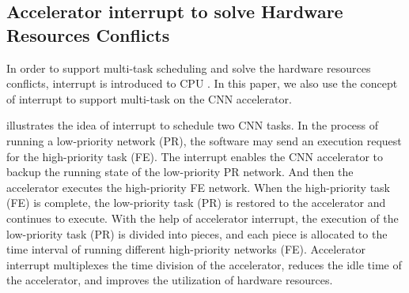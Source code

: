 

\subsection{ Accelerator interrupt to solve Hardware Resources Conflicts }

In order to support multi-task scheduling and solve the hardware resources conflicts, interrupt is introduced to CPU \cite{jen1974processor}. In this paper, we also use the concept of interrupt to support multi-task on the CNN accelerator.


 illustrates the idea of interrupt to schedule two CNN tasks. In the process of running a low-priority network (PR), the software may send an execution request for the high-priority task (FE). The interrupt enables the CNN accelerator to backup the running state of the low-priority PR network. And then the accelerator executes the high-priority FE network. When the high-priority task (FE) is complete, the low-priority task (PR) is restored to the accelerator and continues to execute.
With the help of accelerator interrupt, the execution of the low-priority task (PR) is divided into pieces, and each piece is allocated to the time interval of running different high-priority networks (FE). 
Accelerator interrupt multiplexes the time division of the accelerator, reduces the idle time of the accelerator, and improves the utilization of hardware resources. 


